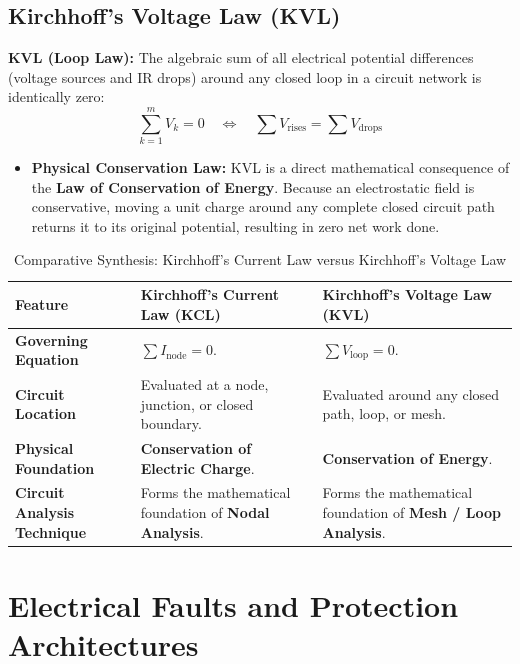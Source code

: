 \subsection{Kirchhoff's Voltage Law (KVL)}
\textbf{KVL (Loop Law):} The algebraic sum of all electrical potential differences (voltage sources and IR drops) around any closed loop in a circuit network is identically zero:
\begin{equation}
\label{eq:kvl_formula}
\boxed{\sum_{k=1}^{m} V_k = 0 \quad \Longleftrightarrow \quad \sum V_{\text{rises}} = \sum V_{\text{drops}}}
\end{equation}
\begin{itemize}
    \item \textbf{Physical Conservation Law:} KVL is a direct mathematical consequence of the \textbf{Law of Conservation of Energy}. Because an electrostatic field is conservative, moving a unit charge around any complete closed circuit path returns it to its original potential, resulting in zero net work done.
\end{itemize}

\begin{table}[htbp]
\centering
\small
\caption{Comparative Synthesis: Kirchhoff's Current Law versus Kirchhoff's Voltage Law}
\label{tab:kcl_vs_kvl}
\begin{tabularx}{\textwidth}{l X X}
\toprule
\textbf{Feature} & \textbf{Kirchhoff's Current Law (KCL)} & \textbf{Kirchhoff's Voltage Law (KVL)} \\
\midrule
\textbf{Governing Equation} & $\sum I_{\text{node}} = 0$. & $\sum V_{\text{loop}} = 0$. \\
\textbf{Circuit Location} & Evaluated at a node, junction, or closed boundary. & Evaluated around any closed path, loop, or mesh. \\
\textbf{Physical Foundation} & \textbf{Conservation of Electric Charge}. & \textbf{Conservation of Energy}. \\
\textbf{Circuit Analysis Technique} & Forms the mathematical foundation of \textbf{Nodal Analysis}. & Forms the mathematical foundation of \textbf{Mesh / Loop Analysis}. \\
\bottomrule
\end{tabularx}
\end{table}

\section{Electrical Faults and Protection Architectures}
\label{sec:electrical_faults}

